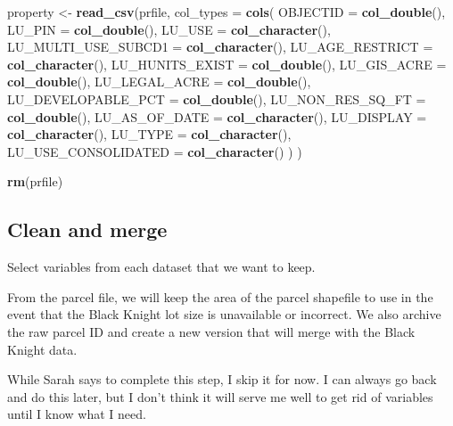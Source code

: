 \documentclass[]{article}
\newenvironment{Shaded}{\begin{snugshade}}{\end{snugshade}}
\newcommand{\KeywordTok}[1]{\textcolor[rgb]{0.13,0.29,0.53}{\textbf{#1}}}
\newcommand{\DataTypeTok}[1]{\textcolor[rgb]{0.13,0.29,0.53}{#1}}
\newcommand{\StringTok}[1]{\textcolor[rgb]{0.31,0.60,0.02}{#1}}
\newcommand{\NormalTok}[1]{#1}
\begin{document}
\begin{Shaded}
\begin{Highlighting}[]
\NormalTok{property <-}\StringTok{ }\KeywordTok{read_csv}\NormalTok{(prfile,}
                     \DataTypeTok{col_types =} \KeywordTok{cols}\NormalTok{(}
  \DataTypeTok{OBJECTID =} \KeywordTok{col_double}\NormalTok{(),}
  \DataTypeTok{LU_PIN =} \KeywordTok{col_double}\NormalTok{(),}
  \DataTypeTok{LU_USE =} \KeywordTok{col_character}\NormalTok{(),}
  \DataTypeTok{LU_MULTI_USE_SUBCD1 =} \KeywordTok{col_character}\NormalTok{(),}
  \DataTypeTok{LU_AGE_RESTRICT =} \KeywordTok{col_character}\NormalTok{(),}
  \DataTypeTok{LU_HUNITS_EXIST =} \KeywordTok{col_double}\NormalTok{(),}
  \DataTypeTok{LU_GIS_ACRE =} \KeywordTok{col_double}\NormalTok{(),}
  \DataTypeTok{LU_LEGAL_ACRE =} \KeywordTok{col_double}\NormalTok{(),}
  \DataTypeTok{LU_DEVELOPABLE_PCT =} \KeywordTok{col_double}\NormalTok{(),}
  \DataTypeTok{LU_NON_RES_SQ_FT =} \KeywordTok{col_double}\NormalTok{(),}
  \DataTypeTok{LU_AS_OF_DATE =} \KeywordTok{col_character}\NormalTok{(),}
  \DataTypeTok{LU_DISPLAY =} \KeywordTok{col_character}\NormalTok{(),}
  \DataTypeTok{LU_TYPE =} \KeywordTok{col_character}\NormalTok{(),}
  \DataTypeTok{LU_USE_CONSOLIDATED =} \KeywordTok{col_character}\NormalTok{()}
\NormalTok{)}
\NormalTok{)}

\KeywordTok{rm}\NormalTok{(prfile)}
\end{Highlighting}
\end{Shaded}

\subsection{Clean and merge}\label{clean-and-merge}

Select variables from each dataset that we want to keep.

From the parcel file, we will keep the area of the parcel shapefile to
use in the event that the Black Knight lot size is unavailable or
incorrect. We also archive the raw parcel ID and create a new version
that will merge with the Black Knight data.

While Sarah says to complete this step, I skip it for now. I can always
go back and do this later, but I don't think it will serve me well to
get rid of variables until I know what I need.
\end{document}
